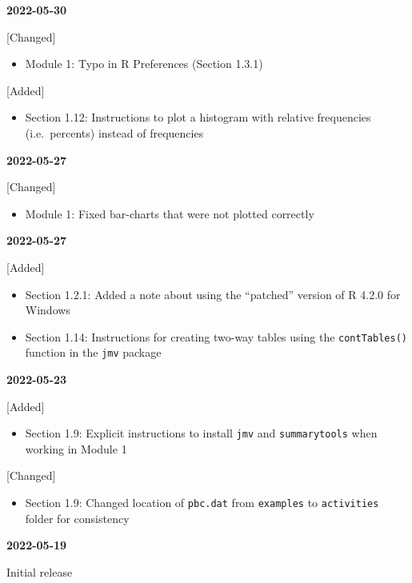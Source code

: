 \documentclass[
]{memoir}
\providecommand{\tightlist}{%
  \setlength{\itemsep}{0pt}\setlength{\parskip}{0pt}}
\begin{document}
\textbf{2022-05-30}

{[}Changed{]}

\begin{itemize}
\tightlist
\item
  Module 1: Typo in R Preferences (Section 1.3.1)
\end{itemize}

{[}Added{]}

\begin{itemize}
\tightlist
\item
  Section 1.12: Instructions to plot a histogram with relative frequencies (i.e.~percents) instead of frequencies
\end{itemize}

\textbf{2022-05-27}

{[}Changed{]}

\begin{itemize}
\tightlist
\item
  Module 1: Fixed bar-charts that were not plotted correctly
\end{itemize}

\textbf{2022-05-27}

{[}Added{]}

\begin{itemize}
\tightlist
\item
  Section 1.2.1: Added a note about using the ``patched'' version of R 4.2.0 for Windows
\item
  Section 1.14: Instructions for creating two-way tables using the \texttt{contTables()} function in the \texttt{jmv} package
\end{itemize}

\textbf{2022-05-23}

{[}Added{]}

\begin{itemize}
\tightlist
\item
  Section 1.9: Explicit instructions to install \texttt{jmv} and \texttt{summarytools} when working in Module 1
\end{itemize}

{[}Changed{]}

\begin{itemize}
\tightlist
\item
  Section 1.9: Changed location of \texttt{pbc.dat} from \texttt{examples} to \texttt{activities} folder for consistency
\end{itemize}

\textbf{2022-05-19}

Initial release
\end{document}
